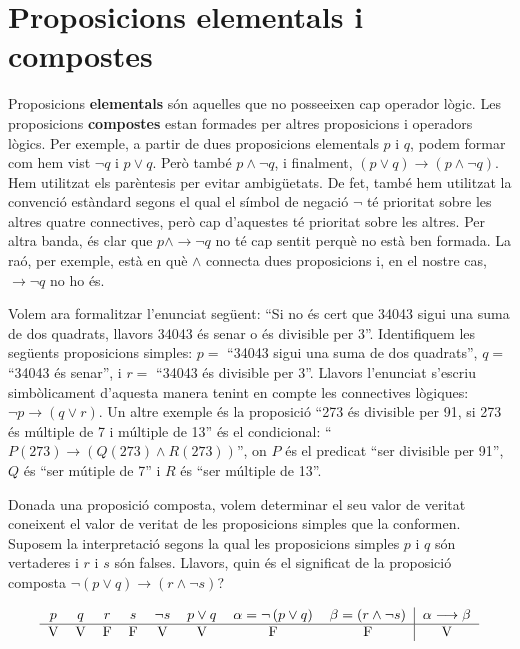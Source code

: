 \section{Proposicions elementals i compostes}

Proposicions \textbf{elementals} són aquelles que no posseeixen cap
operador lògic. Les proposicions \textbf{compostes} estan formades per
altres proposicions i operadors lògics. Per exemple, a partir de dues
proposicions elementals $p$ i $q$, podem formar com hem vist $\lnot q$ i $p\vee q$. Però també $p\wedge\lnot q$, i finalment, $\left( p\vee
q\right) \longrightarrow\left( p\wedge\lnot q\right).$ Hem utilitzat els parèntesis per evitar ambigüetats. De fet, també hem utilitzat la
convenció estàndard segons el qual el símbol de negació $\lnot$ té prioritat sobre les altres quatre connectives, però cap
d'aquestes té prioritat sobre les altres. Per altra banda, és clar
que $p\wedge\longrightarrow\lnot q$ no té cap sentit perquè no està ben formada. La raó, per exemple, està en què $\wedge$
connecta dues proposicions i, en el nostre cas, $\longrightarrow\lnot q$ no
ho és.

Volem ara formalitzar l'enunciat següent: \enquote{Si no és cert que 34043
sigui una suma de dos quadrats, llavors 34043 és senar o és
divisible per 3}. Identifiquem les següents proposicions simples: $p=$
\enquote{34043 sigui una suma de dos quadrats}, $q=$ \enquote{34043 és senar}, i $r=$
\enquote{34043 és divisible per 3}. Llavors l'enunciat s'escriu simbòlicament d'aquesta manera tenint en compte les connectives lògiques: $\lnot p\longrightarrow\left( q\vee r\right).$ Un altre exemple és la proposició \enquote{273 és divisible per 91, si 273 és múltiple de 7 i múltiple de 13} és el condicional: \enquote{$P(273)\longrightarrow\left(
Q(273)\wedge R(273)\right) $}, on $P$ és el predicat \enquote{ser divisible per
91}, $Q$ és \enquote{ser mútiple de 7} i $R$ és \enquote{ser múltiple de 13}.

\bigskip

Donada una proposició composta, volem determinar el seu valor de veritat
coneixent el valor de veritat de les proposicions simples que la conformen.
Suposem la interpretació segons la qual les proposicions simples $p$ i $q $ són vertaderes i $r$ i $s$ són falses. Llavors, quin és el
significat de la proposició composta $\lnot\left( p\vee q\right)
\longrightarrow\left( r\wedge\lnot s\right) $?

\begin{equation*}
\begin{tabular}{cccccccc|c}
$p$ & $q$ & $r$ & $s$ & $\lnot s$ & $p\vee q$ & $\alpha=\lnot\left( p\vee
q\right) $ & $\beta=\left( r\wedge\lnot s\right) $ & $\alpha\longrightarrow
\beta$ \\ \hline
V & V & F & F & V & V & F & F & V\end{tabular}
\end{equation*}

